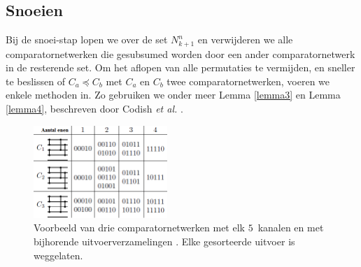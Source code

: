 \documentclass{article}
\begin{document}
\subsection{Snoeien}\label{Snoeien}
Bij de snoei-stap lopen we over de set $N^n_{k+1}$ en verwijderen we alle comparatornetwerken die gesubsumed worden door een ander comparatornetwerk in de resterende set.
Om het aflopen van alle permutaties te vermijden, en sneller te beslissen of $C_a \preceq C_b$ met $C_a$ en $C_b$ twee comparatornetwerken, voeren we enkele methoden in.
Zo gebruiken we onder meer Lemma \ref{lemma3} en Lemma \ref{lemma4}, beschreven door Codish \textit{et al.} \cite{sortingNetworksSize2014}.

\begin{figure}[!h]
	\centering
	\includegraphics[width=0.45\textwidth]{VoorbeeldLemmas.png}
	\caption{Voorbeeld van drie comparatornetwerken met elk $5$~kanalen en met bijhorende uitvoerverzamelingen \protect\cite{sortingNetworksSize2014}. Elke gesorteerde uitvoer is weggelaten.}
	\label{VoorbeeldLemmas}
\end{figure}
\end{document}
